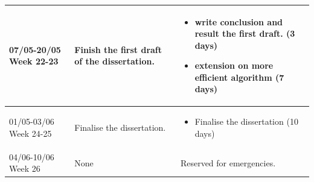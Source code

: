 \documentclass[11pt]{article}
\begin{document}
\begin{longtable}{|p{}|p{}|p{}|}
  07/05-20/05 Week 22-23&
  Finish the first draft of the dissertation. &
  \begin{itemize}
    \item write conclusion and result the first draft. (3 days)
    \item extension on more efficient algorithm (7 days)
  \end{itemize}
  \\ \hline

  01/05-03/06 Week 24-25&
  Finalise the dissertation. &
  \begin{itemize}
    \item Finalise the dissertation (10 days)
  \end{itemize}
  \\ \hline

  04/06-10/06 Week 26&
  None &
  Reserved for emergencies.
  \\ \hline
\end{longtable}


\newpage
\appendix


\end{document}
